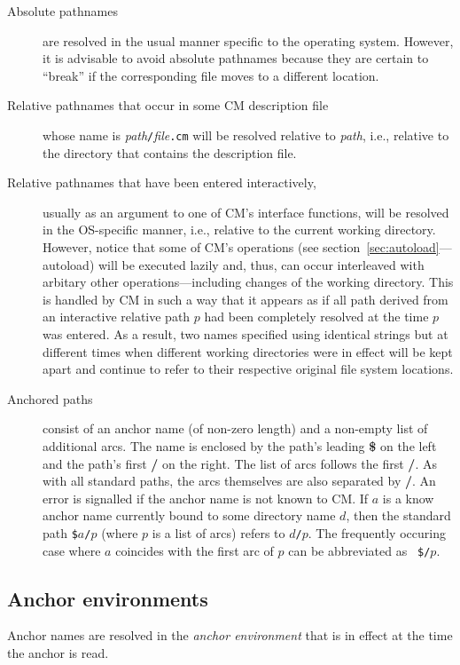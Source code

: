 \begin{description}
\item[Absolute pathnames] are resolved in the usual manner
specific to the operating system.  However, it is advisable to avoid
absolute pathnames because they are certain to ``break'' if the
corresponding file moves to a different location.
\item[Relative pathnames that occur in some CM description file] whose
name is {\it path}{\tt /}{\it file}{\tt .cm} will be resolved relative
to {\it path}, i.e., relative to the directory that contains the
description file.
\item[Relative pathnames that have been entered interactively,]
usually as an argument to one of CM's interface functions, will be
resolved in the OS-specific manner, i.e., relative to the current
working directory.  However, notice that some of CM's operations (see
section~\ref{sec:autoload}---autoload) will be executed lazily and,
thus, can occur interleaved with arbitary other operations---including
changes of the working directory.  This is handled by CM in such a way
that it appears as if all path derived from an interactive relative
path $p$ had been completely resolved at the time $p$ was entered. As
a result, two names specified using identical strings but at different
times when different working directories were in effect will be kept
apart and continue to refer to their respective original file system
locations.
\item[Anchored paths] consist of an anchor name (of non-zero length)
and a non-empty list of additional arcs.  The name is enclosed by
the path's leading {\bf \$} on the left and the path's first {\bf /}
on the right.  The list of arcs follows the first {\bf /}.  As with
all standard paths, the arcs themselves are also separated by {\bf /}.
An error is signalled if the anchor name is not known to CM.
If $a$ is a know anchor name currently bound to some directory name
$d$, then the standard path {\tt \$}$a${\tt /}$p$ (where $p$ is a list
of arcs) refers to $d${\tt /}$p$.  The frequently occuring case where
$a$ coincides with the first arc of $p$ can be abbreviated as {\tt
\$/}$p$.
\end{description}

\subsection{Anchor environments}
\label{sec:anchor:env}

Anchor names are resolved in the {\em anchor environment} that is in
effect at the time the anchor is read.

